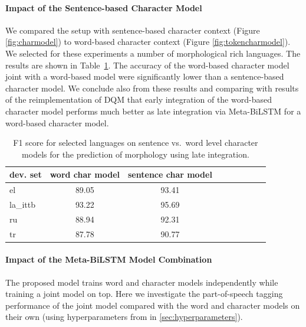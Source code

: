 \documentclass[11pt,a4paper]{article}
\begin{document}
\paragraph{Impact of the Sentence-based Character Model} 
We compared the setup with sentence-based character context  (Figure \ref{fig:charmodel}) to word-based character context (Figure \ref{fig:tokencharmodel}). We selected for these experiments a number of morphological rich languages. The results are shown in Table~\ref{tab:ablation-char-sent-vs-word}. The accuracy of the word-based character model joint with a word-based model were significantly lower than a sentence-based character model. We conclude also from these results and comparing with results of the reimplementation of DQM that early integration of the word-based character model performs much better as late integration via Meta-BiLSTM for a word-based character model. 

 

\begin{table}[t]
\begin{center}
\small
\setlength{\tabcolsep}{3.5pt}
\begin{tabular}{|l|c|c|c|c||c|c|c|c}
\hline 
 \bf dev. set   & word char model & sentence char model\\ 
\hline
el              &  89.05 & 93.41   \\
la\_ittb        &  93.22 & 95.69  \\
ru              &  88.94 & 92.31 \\
tr              &  87.78 & 90.77 \\
 \hline
\end{tabular}
\end{center}
\caption{F1 score for selected languages on sentence vs.~word level character models for the prediction of morphology using late integration.}
\label{tab:ablation-char-sent-vs-word}
\end{table}


\paragraph{Impact of the Meta-BiLSTM Model Combination}

The proposed model trains word and character models independently while training a joint model on top. Here we investigate the part-of-speech tagging performance of the joint model compared with the word and character models on their own (using hyperparameters from in \ref{sec:hyperparameters}). 
\end{document}
